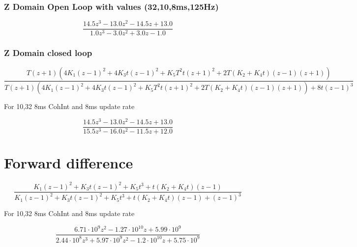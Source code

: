 \subsubsection{Z Domain Open Loop with values (32,10,8ms,125Hz)}
\begin{equation}
\frac{14.5 z^{3} - 13.0 z^{2} - 14.5 z + 13.0}{1.0 z^{3} - 3.0 z^{2} + 3.0 z - 1.0}
\end{equation}





\subsubsection{Z Domain closed loop}
\begin{equation}
\frac{T \left(z + 1\right) \left(4 K_{1} \left(z - 1\right)^{2} + 4 K_{3} t \left(z - 1\right)^{2} + K_{5} T^{2} t \left(z + 1\right)^{2} + 2 T \left(K_{2} + K_{4} t\right) \left(z - 1\right) \left(z + 1\right)\right)}{T \left(z + 1\right) \left(4 K_{1} \left(z - 1\right)^{2} + 4 K_{3} t \left(z - 1\right)^{2} + K_{5} T^{2} t \left(z + 1\right)^{2} + 2 T \left(K_{2} + K_{4} t\right) \left(z - 1\right) \left(z + 1\right)\right) + 8 t \left(z - 1\right)^{3}}
\end{equation}




For 10,32 8ms CohInt and 8ms update rate



\begin{equation}
\frac{14.5 z^{3} - 13.0 z^{2} - 14.5 z + 13.0}{15.5 z^{3} - 16.0 z^{2} - 11.5 z + 12.0}\end{equation}
\clearpage


\section{Forward difference}

\begin{equation}
\frac{K_{1} \left(z - 1\right)^{2} + K_{3} t \left(z - 1\right)^{2} + K_{5} t^{3} + t \left(K_{2} + K_{4} t\right) \left(z - 1\right)}{K_{1} \left(z - 1\right)^{2} + K_{3} t \left(z - 1\right)^{2} + K_{5} t^{3} + t \left(K_{2} + K_{4} t\right) \left(z - 1\right) + \left(z - 1\right)^{3}}
\end{equation}


For 10,32 8ms CohInt and 8ms update rate

\begin{equation}
\frac{6.71 \cdot 10^{9} z^{2} - 1.27 \cdot 10^{10} z + 5.99 \cdot 10^{9}}{2.44 \cdot 10^{8} z^{3} + 5.97 \cdot 10^{9} z^{2} - 1.2 \cdot 10^{10} z + 5.75 \cdot 10^{9}}
\end{equation}


